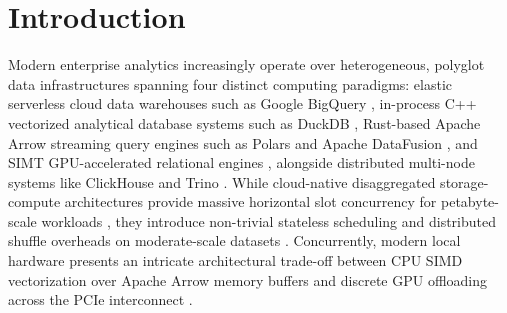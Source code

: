 \documentclass[10pt,a4paper]{article}
\begin{document}
\section{Introduction}
Modern enterprise analytics increasingly operate over heterogeneous, polyglot data infrastructures spanning four distinct computing paradigms: elastic serverless cloud data warehouses such as Google BigQuery \cite{melnik2010dremel, melnik2020dremel, lounissi2025funda}, in-process C++ vectorized analytical database systems such as DuckDB \cite{raasveldt2019duckdb, kuiper2024duckdb_ooc}, Rust-based Apache Arrow streaming query engines such as Polars and Apache DataFusion \cite{lamb2024datafusion}, and SIMT GPU-accelerated relational engines \cite{chrysogelos2019hetexchange, shanbhag2020crystal}, alongside distributed multi-node systems like ClickHouse \cite{schulze2024clickhouse} and Trino \cite{sethi2019presto}. While cloud-native disaggregated storage-compute architectures provide massive horizontal slot concurrency for petabyte-scale workloads \cite{shojaee2024serverless, abdalla2022bigdata}, they introduce non-trivial stateless scheduling and distributed shuffle overheads on moderate-scale datasets \cite{begoli2018calcite, garcia2008database, lounissi2025funda}. Concurrently, modern local hardware presents an intricate architectural trade-off between CPU SIMD vectorization over Apache Arrow memory buffers and discrete GPU offloading across the PCIe interconnect \cite{milicevic2024dlquery, root2019mapd, kim2022blazingsql}.
\end{document}
